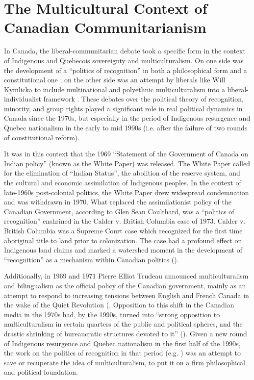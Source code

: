 \documentclass[12pt,oneside]{memoir}
\begin{document}
\section*{The Multicultural Context of Canadian Communitarianism}

In Canada, the liberal-communitarian debate took a specific form in the context of Indigenous and Quebecois sovereignty and multiculturalism. On one side was the development of a ``politics of recognition'' in both a philosophical form \citep{Taylor1994} and a constitutional one \citep{tully-strange}; on the other side was an attempt by liberals like Will Kymlicka to include multinational and polyethnic multiculturalism into a liberal-individualist framework \citep{kymlicka-1995}. These debates over the political theory of recognition, minority, and group rights played a significant role in real political dynamics in Canada since the 1970s, but especially in the period of Indigenous resurgence and Quebec nationalism in the early to mid 1990s (i.e. after the failure of two rounds of constitutional reform). 

It was in this context that the 1969 ``Statement of the Government of Canada on Indian policy'' (known as the White Paper) was released. The White Paper called for the elimination of ``Indian Status'', the abolition of the reserve system, and the cultural and economic assimilation of Indigenous peoples. In the context of late-1960s post-colonial politics, the White Paper drew widespread condemnation and was withdrawn in 1970. What replaced the assimilationist policy of the Canadian Government, according to Glen Sean Coulthard, was a ``politics of recognition'' enshrined in the Calder v. British Columbia case of 1973. Calder v. British Columbia was a Supreme Court case which recognized for the first time aboriginal title to land prior to colonization. The case had a profound effect on Indigenous land claims and marked a watershed moment in the development of ``recognition'' as a mechanism within Canadian politics (\citep[37]{Wrightson2017}). 

Additionally, in 1969 and 1971 Pierre Elliot Trudeau announced multiculturalism and bilingualism as the official policy of the Canadian government, mainly as an attempt to respond to increasing tensions between English and French Canada in the wake of the Quiet Revolution (\citep{Belanger2000, Maclure2005}. Opposition to this shift in the Canadian media in the 1970s had, by the 1990s, turned into ``strong opposition to multiculturalism in certain quarters of the public and political spheres, and the drastic shrinking of bureaucratic structures devoted to it'' (\citep[440]{karim2002}). Given a new round of Indigenous resurgence and Quebec nationalism in the first half of the 1990s, the work on the politics of recognition in that period (e.g. \cite{Taylor1992, kymlicka-1995, tully-strange}) was an attempt to save or recuperate the idea of multiculturalism, to put it on a firm philosophical and political foundation.
\end{document}
